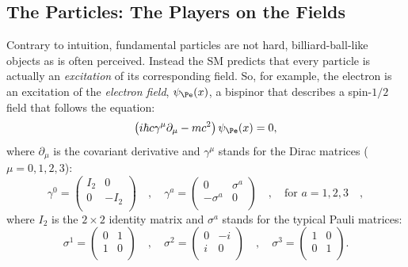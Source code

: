
\subsection{The Particles: The Players on the Fields}
Contrary to intuition, fundamental particles are not hard, billiard-ball-like objects as is often perceived.
Instead the SM predicts that every particle is actually an \emph{excitation} of its corresponding field.
So, for example, the electron is an excitation of the \emph{electron field}, $\psi_{\Pe}(x)$, a bispinor that describes a spin-$1/2$ field that follows the equation: 
\begin{equation}
    \left( i\hbar c \gamma^{\mu}{\partial}_{\mu} - mc^{2} \right)\psi_{\Pe}(x) = 0,
    \label{eqn:dirac_notfinished}
\end{equation}
where $\partial_\mu$ is the covariant derivative and $\gamma^\mu$ stands for the Dirac matrices ($\mu = 0,1,2,3$):
\begin{equation}
    \gamma^0 = 
    \begin{pmatrix}
        I_{2} & 0 \\
        0  & -I_{2} \\
    \end{pmatrix}
    \quad , \quad
    \gamma^a = 
    \begin{pmatrix}
        0 & \sigma^a \\
        -\sigma^a  & 0 \\
    \end{pmatrix}
    \quad , \quad \text{for } a = 1,2,3 \quad ,
    \label{eqn:gamma_matrices}
\end{equation}
where $I_2$ is the $2 \times 2$ identity matrix and $\sigma^a$ stands for the typical Pauli matrices:
\begin{equation*}
    \sigma^1 = 
    \begin{pmatrix}
        0 & 1 \\
        1  & 0 \\
    \end{pmatrix}
    \quad , \quad
    \sigma^2 = 
    \begin{pmatrix}
        0 & -i \\
        i  & 0 \\
    \end{pmatrix}
    \quad , \quad
    \sigma^3 = 
    \begin{pmatrix}
        1 & 0 \\
        0  & 1 \\
    \end{pmatrix}
    .
\end{equation*}
